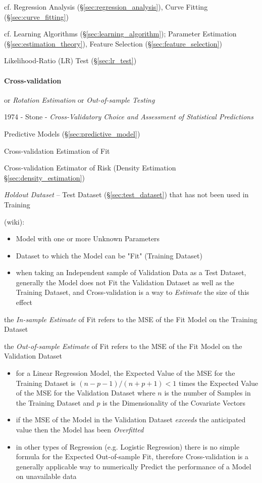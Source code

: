 cf. Regression Analysis (\S\ref{sec:regression_analysis}), Curve Fitting
(\S\ref{sec:curve_fitting})

\fist cf. Learning Algorithms (\S\ref{sec:learning_algorithm});
Parameter Estimation (\S\ref{sec:estimation_theory}), Feature Selection
(\S\ref{sec:feature_selection})

Likelihood-Ratio (LR) Test (\S\ref{sec:lr_test})



\paragraph{Cross-validation}\label{sec:cross_validation}\hfill

or \emph{Rotation Estimation} or \emph{Out-of-sample Testing}

1974 - Stone -
\emph{Cross-Validatory Choice and Assessment of Statistical Predictions}

Predictive Models (\S\ref{sec:predictive_model})

Cross-validation Estimation of Fit

Cross-validation Estimator of Risk (Density Estimation
\S\ref{sec:density_estimation})

\emph{Holdout Dataset} -- Test Dataset (\S\ref{sec:test_dataset}) that has not
been used in Training

(wiki):

\begin{itemize}
  \item Model with one or more Unknown Parameters
  \item Dataset to which the Model can be "Fit" (Training Dataset)
  \item when taking an Independent sample of Validation Data as a Test Dataset,
    generally the Model does not Fit the Validation Dataset as well as the
    Training Dataset, and Cross-validation is a way to \emph{Estimate} the size
    of this effect
\end{itemize}

the \emph{In-sample Estimate} of Fit refers to the MSE of the Fit Model on the
Training Dataset

the \emph{Out-of-sample Estimate} of Fit refers to the MSE of the Fit Model on
the Validation Dataset

\begin{itemize}
  \item for a Linear Regression Model, the Expected Value of the MSE for the
    Training Dataset is $(n - p - 1) / (n + p + 1) < 1$ times the Expected Value
    of the MSE for the Validation Dataset where $n$ is the number of Samples in
    the Training Dataset and $p$ is the Dimensionality of the Covariate Vectors
  \item if the MSE of the Model in the Validation Dataset \emph{exceeds} the
    anticipated value then the Model has been \emph{Overfitted}
  \item in other types of Regression (e.g. Logistic Regression) there is no
    simple formula for the Expected Out-of-sample Fit, therefore
    Cross-validation is a generally applicable way to numerically Predict the
    performance of a Model on unavailable data
\end{itemize}

